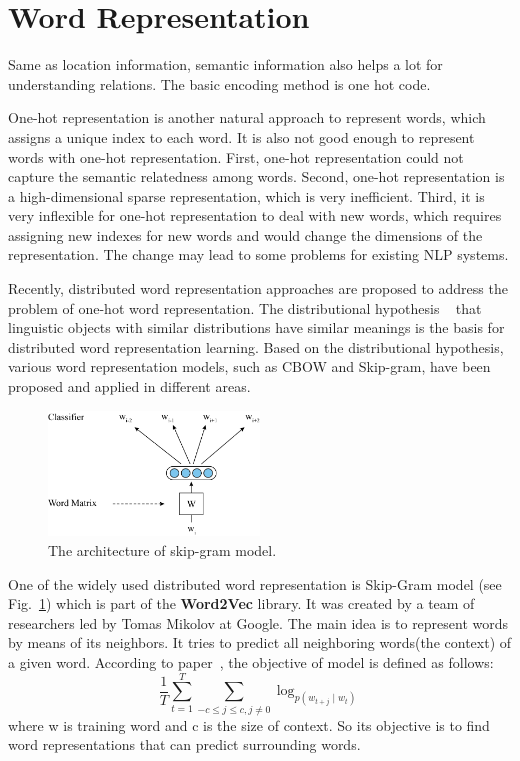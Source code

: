 \section{Word Representation}

Same as location information, semantic information also helps a lot for understanding relations. The basic encoding method is one hot code. 

One-hot representation is another natural approach to represent words, which assigns a unique index to each word. It is also not good enough to represent words with one-hot representation. First, one-hot representation could not capture the semantic relatedness among words. Second, one-hot representation is a high-dimensional sparse representation, which is very inefficient. Third, it is very inflexible for one-hot representation to deal with new words, which requires assigning new indexes for new words and would change the dimensions of the representation. The change may lead to some problems for existing NLP systems.

Recently, distributed word representation approaches are proposed to address the problem of one-hot word representation. The distributional hypothesis ~\cite{bojanowski2017enriching} that linguistic objects with similar distributions have similar meanings is the basis for distributed word representation learning. Based on the distributional hypothesis, various word representation models, such as CBOW and Skip-gram, have been proposed and applied in different areas.


\begin{figure}[!htbp]
	\centering
	\includegraphics[width = 0.5\textwidth]{figures/skip-gram-model.png}
	\caption[The architecture of skip-gram model]
	{ The architecture of skip-gram model.}
	\label{fig:skip-gram-model}
\end{figure}

One of the widely used distributed word representation is Skip-Gram model (see Fig.~\ref{fig:skip-gram-model}) which is part of the \textbf{Word2Vec} library. It was created by a team of researchers led by Tomas Mikolov at Google. The main idea is to represent words by means of its neighbors. It tries to predict all neighboring words(the context) of a given word. According to paper~\cite{mikolov2013distributed}, the objective of model is defined as follows:$$\frac{1}{T}\sum_{t=1}^{T}\sum_{-c\le j\le c,j\ne 0} \log_{ p(w_{t+j}\mid w_t) }$$
where w is training word and c is the size of context. So its objective is to find word representations that can predict surrounding words.

